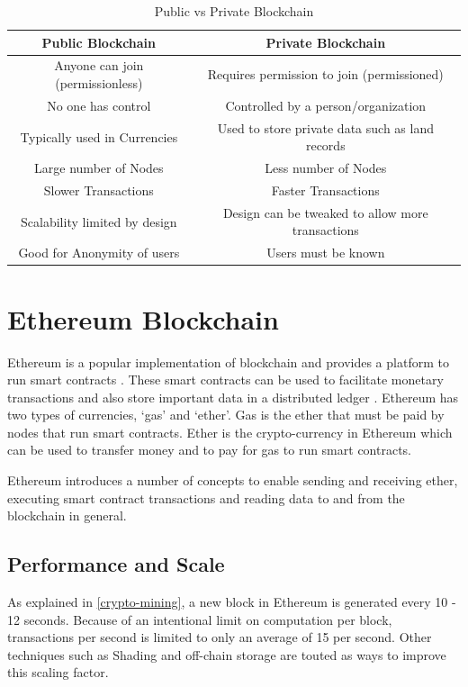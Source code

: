 \documentclass[11pt,openright]{report}
\begin{document}
\begin{table}[!htbp]
	\renewcommand{\arraystretch}{1.3}
	\caption{Public vs Private Blockchain}
	\label{pub_priv_blockchains}
	\centering
	\begin{tabular}{|c|c|}
		\hline
		\bfseries Public Blockchain & \bfseries Private Blockchain \\
		\hline\hline
		Anyone can join (permissionless) & Requires permission to join (permissioned) \\ \hline
	    No one has control & Controlled by a person/organization \\ \hline
        Typically used in Currencies & Used to store private data such as land records \\ \hline
        Large number of Nodes & Less number of Nodes \\ \hline
        Slower Transactions  & Faster Transactions \\ \hline
        Scalability limited by design  & Design can be tweaked to allow more transactions \\ \hline
        Good for Anonymity of users  & Users must be known \\ \hline
	\end{tabular}
\end{table}


\section{Ethereum Blockchain}
Ethereum is a popular implementation of blockchain and provides a platform to run smart contracts \cite{buterin2013whitepaper}. These smart contracts can be used to facilitate monetary transactions and also store important data in a distributed ledger \cite{egbertsen2016replacing}. Ethereum has two types of currencies, ‘gas’ and ‘ether’. Gas is the ether that must be paid by nodes that run smart contracts. Ether is the crypto-currency in Ethereum which can be used to transfer money and to pay for gas to run smart contracts.

Ethereum introduces a number of concepts to enable sending and receiving ether, executing smart contract transactions and reading data to and from the blockchain in general.

\subsection{Performance and Scale}
As explained in \ref{crypto-mining}, a new block in Ethereum is generated every 10 - 12 seconds. Because of an intentional limit on computation per block, transactions per second is limited to only an average of 15 per second. Other techniques such as Shading and off-chain storage are touted as ways to improve this scaling factor. 
\end{document}
